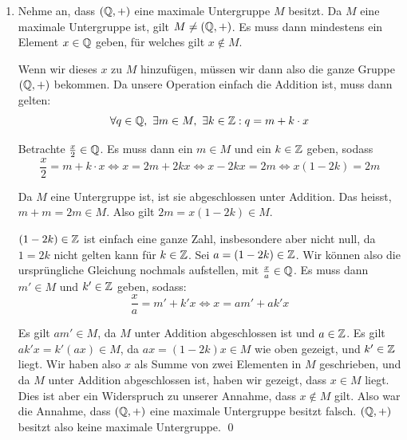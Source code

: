 \documentclass[12pt]{article}
\begin{document}
\begin{enumerate}[label=\alph*)]
    $V$ ist also eine Untergruppe von $G$, welche ungleich $G$ ist. Somit ist $V \in U$.

    Zeige, dass $V$ eine obere Schranke für $C$ ist: für jedes $H \in C$ gilt per Definition der Vereinigung, dass $H \subseteq V$ ist. Somit ist $V$ eine obere Schranke für $C$ bezüglich $\subseteq$.

    Wir haben also eine nicht-leere Partialordnung $(U, \subseteq)$, in welcher jede Kette eine obere Schranke hat. Nach dem Zornschen Lemma haben wir also ein in $U$ maximales Element $M$. Dieses $M$ ist die maximale Untergruppe von $G$. Da $G$ beliebig gewählt, hat jede endlich erzeugte, nichttriviale Gruppe in ZFC eine maximale Untergruppe. \qed

    \item Nehme an, dass $(\mathbb{Q}, +)$ eine maximale Untergruppe $M$ besitzt. Da $M$ eine maximale Untergruppe ist, gilt $M \neq (\mathbb{Q}, +)$. Es muss dann mindestens ein Element $x \in \mathbb{Q}$ geben, für welches gilt $x \notin M$.
    
    Wenn wir dieses $x$ zu $M$ hinzufügen, müssen wir dann also die ganze Gruppe $(\mathbb{Q},+)$ bekommen. Da unsere Operation einfach die Addition ist, muss dann gelten:
    $$
        \forall q \in \mathbb{Q},\ \exists m \in M,\ \exists k \in \mathbb{Z} :  q = m + k \cdot x
    $$

    Betrachte $\frac{x}{2} \in \mathbb{Q}$. Es muss dann ein $m \in M$ und ein $k \in \mathbb{Z}$ geben, sodass
    $$
        \frac{x}{2} = m + k \cdot x \iff x = 2m + 2kx \iff x - 2kx = 2m \iff x(1 - 2k) = 2m
    $$

    Da $M$ eine Untergruppe ist, ist sie abgeschlossen unter Addition. Das heisst, $m + m = 2m \in M$. Also gilt $2m = x(1-2k) \in M$.

    $(1 - 2k) \in \mathbb{Z}$ ist einfach eine ganze Zahl, insbesondere aber nicht null, da $1 = 2k$ nicht gelten kann für $k \in \mathbb{Z}$. Sei $a = (1 - 2k) \in \mathbb{Z}$. Wir können also die ursprüngliche Gleichung nochmals aufstellen, mit $\frac{x}{a} \in \mathbb{Q}$. Es muss dann $m' \in M$ und $k' \in \mathbb{Z}$ geben, sodass:
    $$
        \frac{x}{a} = m' + k' x \iff x = am' + ak'x 
    $$

    Es gilt $am' \in M$, da $M$ unter Addition abgeschlossen ist und $a \in \mathbb{Z}$. Es gilt $ak'x = k'(ax) \in M$, da $ax = (1-2k)x \in M$ wie oben gezeigt, und $k' \in \mathbb{Z}$ liegt. Wir haben also $x$ als Summe von zwei Elementen in $M$ geschrieben, und da $M$ unter Addition abgeschlossen ist, haben wir gezeigt, dass $x \in M$ liegt. Dies ist aber ein Widerspruch zu unserer Annahme, dass $x \notin M$ gilt. Also war die Annahme, dass $(\mathbb{Q}, +)$ eine maximale Untergruppe besitzt falsch. $(\mathbb{Q}, +)$ besitzt also keine maximale Untergruppe. \qed

\end{enumerate}
\end{document}
